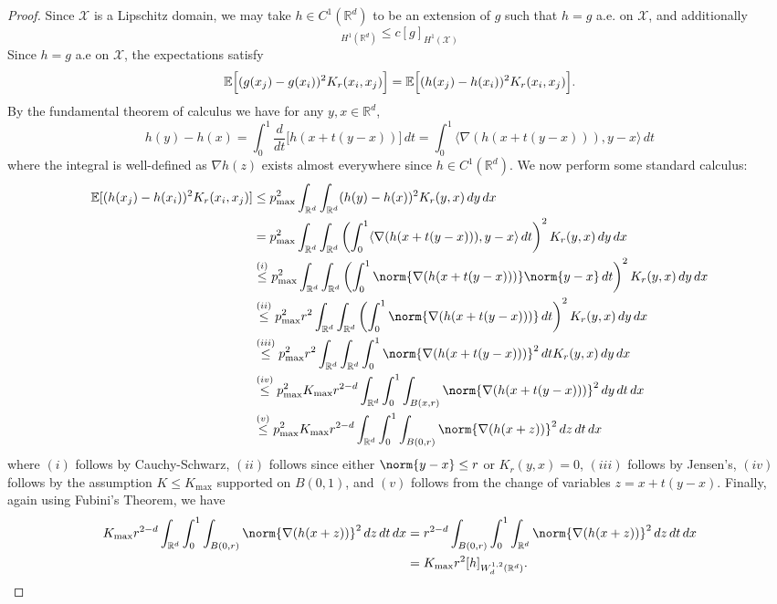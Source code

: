 \documentclass{article}
\newcommand{\Reals}{\mathbb{R}}
\newcommand{\1}{\mathbf{1}}
\newcommand{\Rd}{\Reals^d}
\newcommand{\Xset}{\mathcal{X}}
\newcommand{\Ebb}{\mathbb{E}}
\newcommand{\dotp}[2]{\langle #1, #2 \rangle}
\theoremstyle{alden}
\theoremstyle{aldenthm}
\theoremstyle{definition}
\theoremstyle{remark}
\begin{document}
\begin{proof}
	Since $\Xset$ is a Lipschitz domain, we may take $h \in C^1(\Rd)$ to be an extension of $g$ such that $h = g$ a.e. on $\Xset$, and additionally
	\begin{equation*}
	[h]_{H^1(\Rd)} \leq c[g]_{H^1(\Xset)}
	\end{equation*}
	Since $h = g$ a.e on $\Xset$, the expectations satisfy
	\begin{equation*}
	\Ebb\Bigl[(g(x_j) - g(x_i))^2K_r(x_i,x_j)\Bigr] = \Ebb\Bigl[(h(x_j) - h(x_i))^2K_r(x_i,x_j)\Bigr].
	\end{equation*}
	By the fundamental theorem of calculus we have for any $y,x \in \Rd$,
	\begin{equation}
	\label{eqn:expected_first_order_seminorm_pf1}
	h(y) - h(x) = \int_{0}^{1} \frac{d}{dt}\bigl[h(x + t(y - x))\bigr] \,dt = \int_{0}^{1} \dotp{\nabla(h(x + t(y - x)))}{y - x} \,dt
	\end{equation}
	where the integral is well-defined as $\nabla h(z)$ exists almost everywhere since $h \in C^1(\Rd)$. We now perform some standard calculus:
	\begin{align*}
	\Ebb[(h(x_j) - h(x_i))^2K_r(x_i,x_j)] & \leq p_{\max}^2 \int_{\Rd} \int_{\Rd} (h(y) - h(x))^2 K_r(y,x) \,dy \,dx\\
	& = p_{\max}^2 \int_{\Rd} \int_{\Rd} \left(\int_{0}^{1} \dotp{\nabla(h(x + t(y - x)))}{y - x} \,dt\right)^2 K_r(y,x) \,dy \,dx \\
	& \overset{(i)}{\leq} p_{\max}^2 \int_{\Rd} \int_{\Rd} \left(\int_{0}^{1} \norm{\nabla(h(x + t(y - x)))}\norm{y - x} \,dt\right)^2 K_r(y,x) \,dy \,dx \\
	& \overset{(ii)}{\leq} p_{\max}^2 r^2\int_{\Rd} \int_{\Rd} \left(\int_{0}^{1} \norm{\nabla(h(x + t(y - x)))}\,dt\right)^2 K_r(y,x) \,dy \,dx \\
	& \overset{(iii)}{\leq} p_{\max}^2 r^2\int_{\Rd} \int_{\Rd} \int_{0}^{1} \norm{\nabla(h(x + t(y - x)))}^2 \,dt K_r(y,x) \,dy \,dx \\
	& \overset{(iv)}{\leq} p_{\max}^2 K_{\max} r^{2 - d}\int_{\Rd} \int_{0}^{1} \int_{B(x,r)} \norm{\nabla(h(x + t(y - x)))}^2 \,dy \,dt \,dx \\
	& \overset{(v)}{\leq}  p_{\max}^2 K_{\max} r^{2 - d}\int_{\Rd} \int_{0}^{1} \int_{B(0,r)} \norm{\nabla(h(x + z))}^2  \,dz \,dt \,dx
	\end{align*}
	where $(i)$ follows by Cauchy-Schwarz, $(ii)$ follows since either $\norm{y - x} \leq r$ or $K_r(y,x) = 0$, $(iii)$ follows by Jensen's, $(iv)$ follows by the assumption $K \leq K_{\max}$ supported on $B(0,1)$, and $(v)$ follows from the change of variables $z = x + t(y - x)$. Finally, again using Fubini's Theorem, we have
	\begin{align*}
	K_{\max} r^{2 - d}\int_{\Rd} \int_{0}^{1} \int_{B(0,r)} \norm{\nabla(h(x + z))}^2  \,dz \,dt \,dx & = r^{2 - d}\int_{B(0,r)} \int_{0}^{1} \int_{\Rd} \norm{\nabla(h(x + z))}^2  \,dz \,dt \,dx \\
	& = K_{\max} r^2 [h]_{W_d^{1,2}(\Rd)}.
	\end{align*}
\end{proof}
\end{document}
